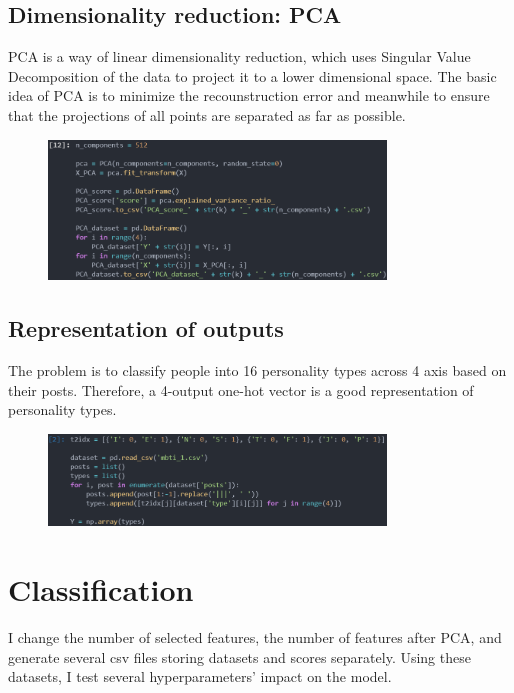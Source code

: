 \documentclass[UTF8, a4paper, 11pt]{article}
\begin{document}
\subsection{Dimensionality reduction: PCA}
PCA is a way of linear dimensionality reduction, which uses Singular Value Decomposition of the data to project it to a lower dimensional space.
The basic idea of PCA is to minimize the recounstruction error and meanwhile to ensure that the projections of all points are separated as far as possible.
\begin{figure}[H]
    \centering
    \includegraphics[width=0.8\textwidth]{pca.png}
\end{figure}
\subsection{Representation of outputs}
The problem is to classify people into 16 personality types across 4 axis based on their posts.
Therefore, a 4-output one-hot vector is a good representation of personality types.
\begin{figure}[H]
    \centering
    \includegraphics[width=0.8\textwidth]{4-outputs.png}
\end{figure}
\section{Classification}
I change the number of selected features, the number of features after PCA, and generate several csv files storing datasets and scores separately.
Using these datasets, I test several hyperparameters' impact on the model.
\end{document}
